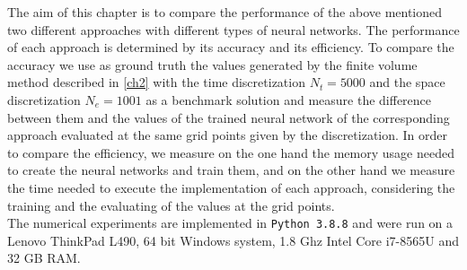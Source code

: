 The aim of this chapter is to compare the performance of the above mentioned two different approaches with different types of neural networks. The performance of each approach is determined by its accuracy and its efficiency. To compare the accuracy we use as ground truth the values generated by the finite volume method described in \cref{ch2} with the time discretization $N_t = 5000$ and the space discretization $N_e = 1001$ as a benchmark solution and measure the difference between them and the values of the trained neural network of the corresponding approach evaluated at the same grid points given by the discretization. In order to compare the efficiency, we measure on the one hand the memory usage needed to create the neural networks and train them, and on the other hand we measure the time needed to execute the implementation of each approach, considering the training and the evaluating of the values at the grid points. \\
The numerical experiments are implemented in \lstinline!Python 3.8.8! and were run on a Lenovo ThinkPad L490, 64 bit Windows system, 1.8 Ghz Intel Core i7-8565U and 32 GB RAM.


